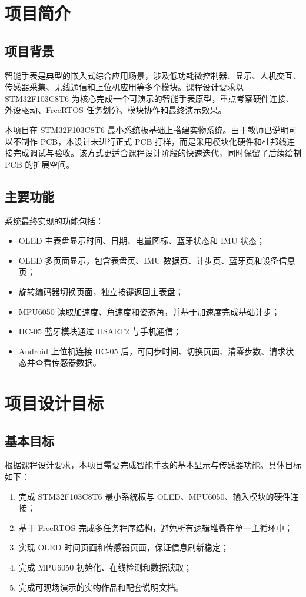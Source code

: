 \documentclass[UTF8,fontset=windows,12pt,a4paper]{ctexart}
\begin{document}
\section{项目简介}

\subsection{项目背景}

智能手表是典型的嵌入式综合应用场景，涉及低功耗微控制器、显示、人机交互、传感器采集、无线通信和上位机应用等多个模块。课程设计要求以 STM32F103C8T6 为核心完成一个可演示的智能手表原型，重点考察硬件连接、外设驱动、FreeRTOS 任务划分、模块协作和最终演示效果。

本项目在 STM32F103C8T6 最小系统板基础上搭建实物系统。由于教师已说明可以不制作 PCB，本设计未进行正式 PCB 打样，而是采用模块化硬件和杜邦线连接完成调试与验收。该方式更适合课程设计阶段的快速迭代，同时保留了后续绘制 PCB 的扩展空间。

\subsection{主要功能}

系统最终实现的功能包括：
\begin{itemize}[leftmargin=2em]
  \item OLED 主表盘显示时间、日期、电量图标、蓝牙状态和 IMU 状态；
  \item OLED 多页面显示，包含表盘页、IMU 数据页、计步页、蓝牙页和设备信息页；
  \item 旋转编码器切换页面，独立按键返回主表盘；
  \item MPU6050 读取加速度、角速度和姿态角，并基于加速度完成基础计步；
  \item HC-05 蓝牙模块通过 USART2 与手机通信；
  \item Android 上位机连接 HC-05 后，可同步时间、切换页面、清零步数、请求状态并查看传感器数据。
\end{itemize}

\section{项目设计目标}

\subsection{基本目标}

根据课程设计要求，本项目需要完成智能手表的基本显示与传感器功能。具体目标如下：
\begin{enumerate}[leftmargin=2em]
  \item 完成 STM32F103C8T6 最小系统板与 OLED、MPU6050、输入模块的硬件连接；
  \item 基于 FreeRTOS 完成多任务程序结构，避免所有逻辑堆叠在单一主循环中；
  \item 实现 OLED 时间页面和传感器页面，保证信息刷新稳定；
  \item 完成 MPU6050 初始化、在线检测和数据读取；
  \item 完成可现场演示的实物作品和配套说明文档。
\end{enumerate}
\end{document}

